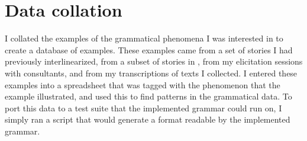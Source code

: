 

\section{Data collation} \label{ch:method:collation}

I collated the examples of the grammatical phenomena I was interested in to create a database of examples. These examples came from a set of stories I had previously interlinearized, from a subset of stories in \citet{sapir1939}, from my elicitation sessions with consultants, and from my transcriptions of texts I collected. I entered these examples into a spreadsheet that was tagged with the phenomenon that the example illustrated, and used this to find patterns in the grammatical data. To port this data to a test suite that the implemented grammar could run on, I simply ran a script that would generate a format readable by the implemented grammar.

